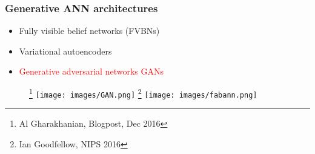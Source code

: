 \documentclass{beamer}
\newcommand{\red}[1]{\textcolor{red}{#1}}
\begin{document}
\begin{frame}
\frametitle{Generative ANN architectures}
    \begin{itemize}

        \item Fully visible belief networks (FVBNs)
        \item Variational autoencoders
        \item \red{Generative adversarial networks GANs}

    \end{itemize}


    \begin{figure}[ht]
        \centering
        \footnote{Al Gharakhanian,  Blogpost, Dec 2016}
        \texttt{[image: images/GAN.png]}
        \footnote{Ian Goodfellow, NIPS 2016}
        \texttt{[image: images/fabann.png]}
    \end{figure}   
\end{frame}



\end{document}
